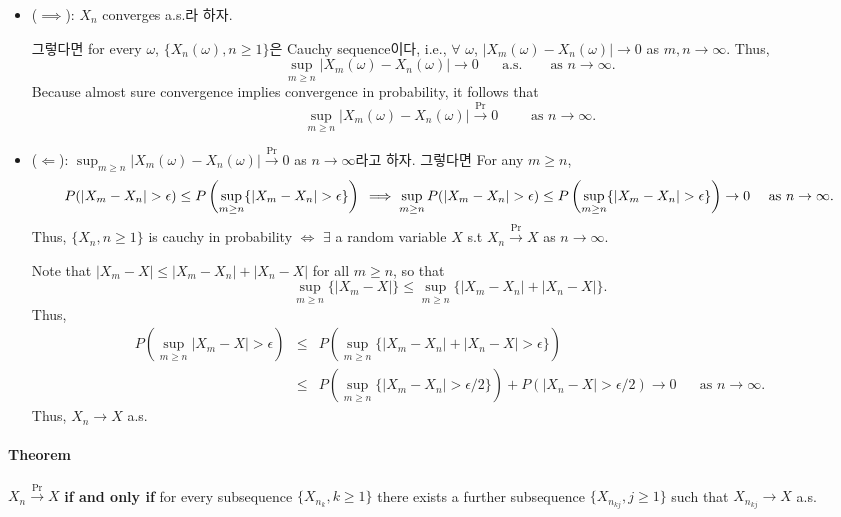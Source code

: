 \documentclass[]{article}
\let\oldparagraph\paragraph
\renewcommand{\paragraph}[1]{\oldparagraph{#1}\mbox{}}
\begin{document}
\begin{itemize}
\item
  (\(\implies\)): \(X_n\) converges a.s.라 하자.

  그렇다면 for every \(\omega\), \(\{X_n(\omega),n\ge 1\}\)은 Cauchy
  sequence이다, i.e., \(\forall\) \(\omega\),
  \(|X_m(\omega)-X_n(\omega)|\rightarrow 0\) as
  \(m,n\rightarrow \infty\). Thus, \[
  \sup_{m\ge n}|X_m(\omega)-X_n(\omega)|\rightarrow 0 \mbox{ }\mbox{ }\mbox{  a.s. } \mbox{ }\mbox{ } \mbox{ as } n\rightarrow \infty.
  \] Because almost sure convergence implies convergence in probability,
  it follows that \[     
   \sup_{m\ge n}|X_m(\omega)-X_n(\omega)|\stackrel{\text{Pr}}\rightarrow 0 \mbox{ }\mbox{ }\mbox{ }\mbox{ as } n\rightarrow \infty.
   \]
\item
  (\(\Longleftarrow\)):
  \(\sup_{m\ge n}|X_m(\omega)-X_n(\omega)|\stackrel{\text{Pr}}\rightarrow 0\)
  as \(n\rightarrow \infty\)라고 하자. 그렇다면 For any \(m\ge n\), \[
     P(|X_m-X_n|>\epsilon)\le P\left(\sup_{m\ge n}\{|X_m-X_n|>\epsilon\}\right)\\
     \implies \sup_{m\ge n}P(|X_m-X_n|>\epsilon) \le P\left(\sup_{m\ge n}\{|X_m-X_n|>\epsilon\}\right)\rightarrow 0\mbox{ }\mbox{ }\mbox{ }\mbox{ as }n\rightarrow \infty.
     \] Thus, \(\{X_n,n\ge 1\}\) is cauchy in probability \(\iff\)
  \(\exists\) a random variable \(X\) s.t
  \(X_n\stackrel{\text{Pr}}\rightarrow X\) as \(n\rightarrow \infty\).

  Note that \(|X_m-X|\le |X_m-X_n|+|X_n-X|\) for all \(m\ge n\), so that
  \[
     \sup_{m\ge n}\{|X_m-X|\}\le    \sup_{m\ge n}\{|X_m-X_n|+ |X_n-X|\}.
     \] Thus, \[\begin{eqnarray*}
     P\left( \sup_{m\ge n}|X_m-X|>\epsilon\right)&\le&P\left(\sup_{m\ge n}\{|X_m-X_n|+ |X_n-X|>\epsilon\}\right)\\
     &\le&P(\sup_{m\ge n}\{|X_m-X_n|>\epsilon/2\})+P(|X_n-X|>\epsilon/2)\rightarrow 0 \mbox{ }\mbox{ }\mbox{ as }n\rightarrow \infty. 
     \end{eqnarray*}\] Thus, \(X_n\rightarrow X\) a.s.
\end{itemize}

\hypertarget{theorem-6}{%
\paragraph{Theorem}\label{theorem-6}}

\(X_n\stackrel{\text{Pr}}\rightarrow X\) \textbf{if and only if} for
every subsequence \(\{X_{n_k},k\ge 1\}\) there exists a further
subsequence \(\{X_{n_{kj}},j\ge 1\}\) such that
\(X_{n_{kj}}\rightarrow X\) a.s.
\end{document}
